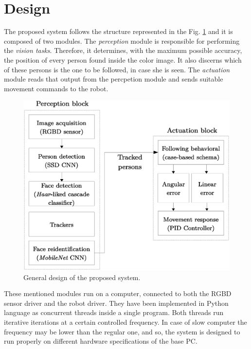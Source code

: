 \section{Design}

The proposed system follows the structure represented in the Fig. \ref{fig:infra_scheme} and it is composed of two modules. The \emph{perception} module is responsible for performing the \emph{vision tasks}. Therefore, it determines, with the maximum possible accuracy, the position of every person found inside the color image. It also discerns which of these persons is the one to be followed, in case she is seen. The \emph{actuation} module reads that output from the percpetion module and sends suitable movement commands to the robot.

\begin{figure}[h]
	\centering
	\includegraphics[width=12cm]{images/system_schema}
	\caption{General design of the proposed system.}
	\label{fig:infra_scheme}
\end{figure}

These mentioned modules run on a computer, connected to both the RGBD sensor driver and the robot driver. They have been implemented in Python language as concurrent threads inside a single program. Both threads run iterative iterations at a certain controlled frequency. In case of slow computer the frequency may be lower than the regular one, and so, the system is designed to run properly on different hardware specifications of the base PC.